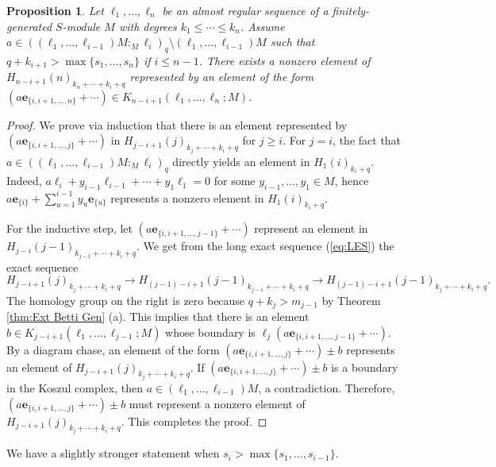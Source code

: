 \documentclass[a4paper, 10pt, reqno, english, ones]{amsart}  %
\newtheorem{proposition}[theorem]{Proposition}
\theoremstyle{definition}
\theoremstyle{remark}
\begin{document}
\begin{proposition}\label{prop:Kosz Hom rep}
Let $\ell_1,\dots, \ell_n$ be an almost regular sequence of a finitely-generated $S$-module $M$ with degrees $k_1\leq \cdots\leq k_n$. Assume ${a}\in ((\ell_1,\dots,\ell_{i-1})M:_M \ell_{i})_{q}\setminus (\ell_1,\dots,\ell_{i-1})M$ such that $q+k_{i+1} > \max\{ s_{1},\dots,s_n\} $ if $i\leq n-1$. There exists a nonzero element of $H_{n-i+1}(n)_{k_n+\cdots+k_i+q}$ represented by an element of the form $(a\mathbf{e}_{\{i,i+1,\dots,n \}}+\cdots)\in K_{n-i+1}(\ell_1,\dots,\ell_n;M)$.
\end{proposition}
\begin{proof}
    We prove via induction that there is an element represented by $(a\mathbf{e}_{\{i,i+1,\dots,j\}}+\cdots)$ in $H_{j-i+1}(j)_{k_j+\cdots+k_i + q}$ for $j\geq i$. For $j=i$, the fact that ${a}\in ((\ell_1,\dots,\ell_{i-1})M:_M \ell_{i})_{q}$ directly yields an element in $H_{1}(i)_{k_i + q}$. Indeed,  $a\ell_i+y_{i-1}\ell_{i-1} +\cdots+y_1\ell_1=0$ for some $y_{i-1},\dots,y_1\in M$, hence $a\mathbf{e}_{\{i\}}+\sum_{u=1}^{i-1} y_u\mathbf{e}_{\{u\}}$ represents a nonzero element in $H_{1}(i)_{k_i + q}$. 

    For the inductive step, let $(a\mathbf{e}_{\{i,i+1,\dots,j-1\}}+\cdots)$ represent an element in $H_{j-i}(j-1)_{k_{j-1}+\cdots+k_i + q}$. We get from the long exact sequence (\ref{eq:LES}) the exact sequence
    \[
    H_{j-i+1}(j)_{k_j+\cdots+k_i+q}\longrightarrow H_{(j-1)-i+1}(j-1)_{k_{j-1}+\cdots+k_i+q}\longrightarrow H_{(j-1)-i+1}(j-1)_{k_j+\cdots+k_i+q}.
    \]
    The homology group on the right is zero because $q+k_j>m_{j-1}$ by Theorem \ref{thm:Ext Betti Gen} (a). This implies that there is an element $b\in K_{j-i+1}(\ell_1,\dots,\ell_{j-1};M)$ whose boundary is $\ell_j(a\mathbf{e}_{\{i,i+1,\dots,j-1\}}+\cdots)$. By a diagram chase, an element of the form $(a\mathbf{e}_{\{i,i+1,\dots,j\}}+\cdots) \pm b$ represents an element of $H_{j-i+1}(j)_{k_j+\cdots+k_i+q}$. If $(a\mathbf{e}_{\{i,i+1,\dots,j\}}+\cdots) \pm b$ is a boundary in the Koszul complex, then $a\in (\ell_1,\dots,\ell_{i-1})M$, a contradiction. Therefore, $(a\mathbf{e}_{\{i,i+1,\dots,j\}}+\cdots) \pm b$ must represent a nonzero element of $H_{j-i+1}(j)_{k_j+\cdots+k_i+q}$. This completes the proof.
\end{proof}

\noindent We have a slightly stronger statement when $s_i>\max\{s_1,\dots,s_{i-1}\}$.
\end{document}
